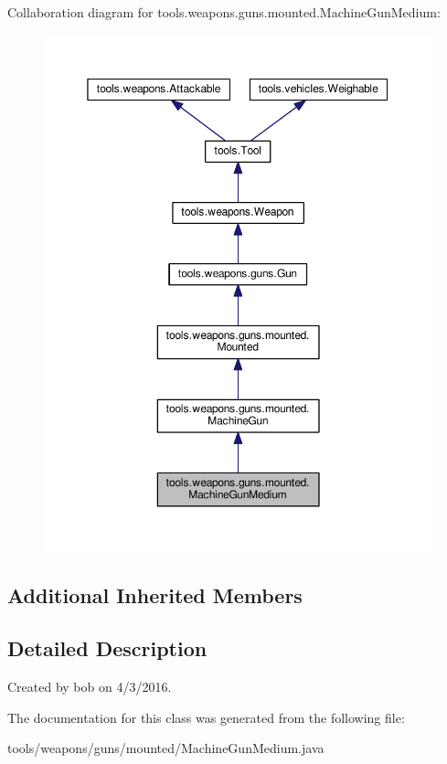 Collaboration diagram for tools.\+weapons.\+guns.\+mounted.\+Machine\+Gun\+Medium\+:
\nopagebreak
\begin{figure}[H]
\begin{center}
\leavevmode
\includegraphics[width=350pt]{classtools_1_1weapons_1_1guns_1_1mounted_1_1_machine_gun_medium__coll__graph}
\end{center}
\end{figure}
\subsection*{Additional Inherited Members}


\subsection{Detailed Description}
Created by bob on 4/3/2016. 

The documentation for this class was generated from the following file\+:\begin{DoxyCompactItemize}
\item 
tools/weapons/guns/mounted/Machine\+Gun\+Medium.\+java\end{DoxyCompactItemize}
